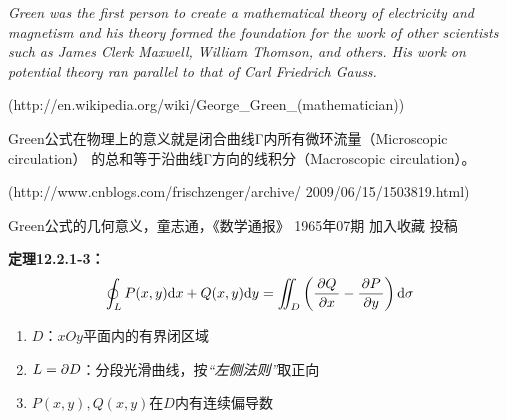 \begin{shaded}
	\bigskip
	
	{\it Green was the first person to create a mathematical theory 
	of electricity and magnetism and his theory formed the foundation 
	for the work of other scientists such as James Clerk Maxwell, 
	William Thomson, and others. His work on potential theory ran 
	parallel to that of Carl Friedrich Gauss.}
	
	\hfill (http://en.wikipedia.org/wiki/George\_Green\_(mathematician))
	
	\bigskip
	
	Green公式在物理上的意义就是闭合曲线Γ内所有微环流量（Microscopic circulation）
	的总和等于沿曲线Γ方向的线积分（Macroscopic circulation）。

	\hfill (http://www.cnblogs.com/frischzenger/archive/
	2009/06/15/1503819.html)

	\bigskip
	Green公式的几何意义，童志通，《数学通报》 1965年07期 加入收藏 投稿
\end{shaded}

{\bf 定理12.2.1-3：}$$\oint_LP(x,y)\mathrm{d} x+Q(x,y)\mathrm{d} y=\iint_D\left(
\displaystyle\frac{\,{\partial Q}\,}{\,{\partial x}\,}-\displaystyle\frac{\,{\partial P}\,}{\,{\partial y}\,}\right)\mathrm{d}\sigma$$

\begin{enumerate}[(1)]
  \setlength{\itemindent}{1cm}
  \item $D$：$xOy$平面内的有界闭区域
  \item $L=\partial D$：分段光滑曲线，按{\it “左侧法则”}取正向
  \item $P(x,y),Q(x,y)$在$D$内有连续偏导数
\end{enumerate}

